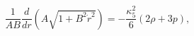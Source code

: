 \begin{equation}
\frac{1}{AB}\frac{d}{dr}(A\sqrt{1+B^2\dot r^2})=-\frac{\kappa_5^2}{6}(2\rho+3p),
\end{equation}

